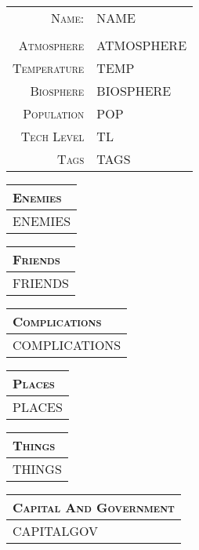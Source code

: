 \documentclass[12pt,letterpaper,twocolumn]{article}
\begin{document}
\begin{tabularx}{\linewidth}{ r | X |}
    \cline{2-2}
    \textsc{Name:} & NAME \\
    \cline{2-2}
    \multicolumn{2}{c}{} \\
    \cline{2-2}
    \textsc{Atmosphere} & ATMOSPHERE \\
    \cline{2-2}
    \textsc{Temperature} & TEMP \\
    \cline{2-2}
    \textsc{Biosphere} & BIOSPHERE \\
    \cline{2-2}
    \textsc{Population} & POP \\
    \cline{2-2}
    \textsc{Tech Level} & TL \\
    \cline{2-2}
    \textsc{Tags} & TAGS \\
    \cline{2-2}
\end{tabularx}

\begin{tabularx}{\linewidth}{| X |}
    \multicolumn{1}{l}{\textsc{Enemies}} \\
    \hline
    ENEMIES \\
    \hline
\end{tabularx}

\begin{tabularx}{\linewidth}{| X |}
    \multicolumn{1}{l}{\textsc{Friends}} \\
    \hline
    FRIENDS \\
    \hline
\end{tabularx}

\begin{tabularx}{\linewidth}{| X |}
    \multicolumn{1}{l}{\textsc{Complications}} \\
    \hline
    COMPLICATIONS \\
    \hline
\end{tabularx}

\begin{tabularx}{\linewidth}{| X |}
    \multicolumn{1}{l}{\textsc{Places}} \\
    \hline
    PLACES \\
    \hline
\end{tabularx}

\begin{tabularx}{\linewidth}{| X |}
    \multicolumn{1}{l}{\textsc{Things}} \\
    \hline
    THINGS \\
    \hline
\end{tabularx}

\begin{tabularx}{\linewidth}{| X |}
    \multicolumn{1}{l}{\textsc{Capital And Government}} \\
    \hline
    CAPITALGOV \\
    \hline
\end{tabularx}
\end{document}
